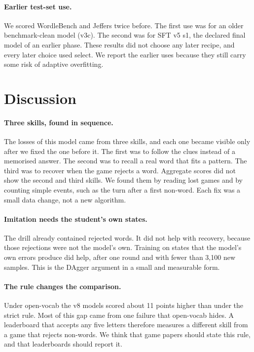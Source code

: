 \documentclass{article}
\begin{document}
\paragraph{Earlier test-set use.} We scored WordleBench and Jeffers twice before. The first use was for an older benchmark-clean model (v3c). The second was for SFT v5 s1, the declared final model of an earlier phase. These results did not choose any later recipe, and every later choice used select. We report the earlier uses because they still carry some risk of adaptive overfitting.

\section{Discussion}
\label{sec:discussion}

\paragraph{Three skills, found in sequence.} The losses of this model came from three skills, and each one became visible only after we fixed the one before it. The first was to follow the clues instead of a memorised answer. The second was to recall a real word that fits a pattern. The third was to recover when the game rejects a word. Aggregate scores did not show the second and third skills. We found them by reading lost games and by counting simple events, such as the turn after a first non-word. Each fix was a small data change, not a new algorithm.

\paragraph{Imitation needs the student's own states.} The drill already contained rejected words. It did not help with recovery, because those rejections were not the model's own. Training on states that the model's own errors produce did help, after one round and with fewer than 3,100 new samples. This is the DAgger argument \citep{ross2011dagger} in a small and measurable form.

\paragraph{The rule changes the comparison.} Under open-vocab the v8 models scored about 11 points higher than under the strict rule. Most of this gap came from one failure that open-vocab hides. A leaderboard that accepts any five letters therefore measures a different skill from a game that rejects non-words. We think that game papers should state this rule, and that leaderboards should report it.
\end{document}
